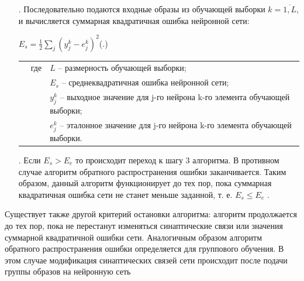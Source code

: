 {\begin{itemize}[leftmargin=2.15cm, labelwidth=0.65cm, labelsep=0.0cm]
\begin{itemize}[leftmargin=1.5cm, labelwidth=0.65cm, labelsep=0.0cm]
		\end{itemize}
		
		\addtocounter{itemcntr}{1}
		
		\item[\theitemcntr. ] Последовательно подаются входные образы из обучающей выборки $k = \overline{1,L}$, и вычисляется суммарная квадратичная ошибка нейронной сети:
		
		\formulaspace \par \redline 
		$E_{s} = \frac{1}{2} \sum \limits _{j}^{} (y_{j}^{k} - e_{j}^{k})^{2} $\hfill (\thechaptercntr .\theformulacntr) \redline
		\formulaspace \addtocounter{formulacntr}{1}
		
		\begin{tabular}{p{}p{}p{}}
			& где  & $ L $ {--} размерность обучающей выборки;\\
			&      & $ E_s $ {--} среднеквадратичная ошибка нейронной сети;\\
			&      & $y_{j}^{k}$ {--} выходное значение для j-го нейрона k-го элемента обучающей выборки; \\
			&      & $e_{j}^{k}$ {--} эталонное значение для j-го нейрона k-го элемента обучающей выборки. \\
		\end{tabular}
		
		\addtocounter{itemcntr}{1}
		
		
		\item[\theitemcntr. ] Если $E_s > E_e$ то происходит переход к шагу 3 алгоритма. В противном случае алгоритм обратного распространения ошибки заканчивается. Таким образом, данный алгоритм функционирует до тех пор, пока суммарная квадратичная ошибка сети не станет меньше заданной, т. е. $E_s \leq E_e$ .
		
		\addtocounter{itemcntr}{1}
		
		\setcounter{itemcntr}{1}
	\end{itemize}
	
	\par \redline Существует также другой критерий остановки алгоритма: алгоритм	продолжается до тех пор, пока не перестанут изменяться синаптические связи или значения суммарной квадратичной ошибки сети. Аналогичным образом алгоритм обратного распространения ошибки определяется для группового обучения. В этом случае модификация синаптических связей сети происходит после подачи группы образов на нейронную сеть
	
	\par
}

